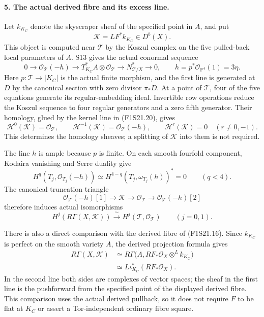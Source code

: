 \paragraph{5. The actual derived fibre and its excess line.}
Let $k_{K_C}$ denote the skyscraper sheaf of the specified
point in $A$, and put
\[
                      \mathcal K=LF^*k_{K_C}\in D^b(X).
 \tag{F1S21.19}
\]
This object is computed near $\mathcal T$ by the Koszul
complex on the five pulled-back local parameters of
$A$. S13 gives the actual conormal sequence
\[
 0\longrightarrow\mathcal O_{\mathcal T}(-h)
 \longrightarrow T^*_{K_C}A\otimes\mathcal O_{\mathcal T}
 \longrightarrow N^*_{\mathcal T/X}\longrightarrow0,
 \qquad h=p^*\mathcal O_{\mathbb P^4}(1)=3\eta.
 \tag{F1S21.20}
\]
Here $p:\mathcal T\to|K_C|$ is the actual finite morphism,
and the first line is generated at $D$ by the canonical
section with zero divisor $\pi_*D$. At a point of
$\mathcal T$, four of the five equations generate its
regular-embedding ideal. Invertible row operations reduce
the Koszul sequence to four regular generators and a
zero fifth generator. Their homology, glued by the kernel
line in (F1S21.20), gives
\[
 \mathcal H^0(\mathcal K)=\mathcal O_{\mathcal T},\qquad
 \mathcal H^{-1}(\mathcal K)=\mathcal O_{\mathcal T}(-h),
 \qquad \mathcal H^r(\mathcal K)=0\quad(r\ne0,-1).
 \tag{F1S21.21}
\]
This determines the homology sheaves; a splitting of
$\mathcal K$ into them is not required.

The line $h$ is ample because $p$ is finite. On each smooth
fourfold component, Kodaira vanishing and Serre duality
give
\[
 H^q(T_j,\mathcal O_{T_j}(-h))
 \simeq H^{4-q}(T_j,\omega_{T_j}(h))^*=0
                                  \qquad(q<4).
 \tag{F1S21.22}
\]
The canonical truncation triangle
\[
 \mathcal O_{\mathcal T}(-h)[1]\longrightarrow\mathcal K
 \longrightarrow\mathcal O_{\mathcal T}
 \longrightarrow\mathcal O_{\mathcal T}(-h)[2]
 \tag{F1S21.23}
\]
therefore induces actual isomorphisms
\[
 H^j(R\Gamma(X,\mathcal K))
       \xrightarrow{\ \sim\ }H^j(\mathcal T,\mathcal O_{\mathcal T})
                           \qquad(j=0,1).
 \tag{F1S21.24}
\]

There is also a direct comparison with the derived fibre
of (F1S21.16). Since $k_{K_C}$ is perfect on the smooth
variety $A$, the derived projection formula gives
\[
 \begin{split}
 R\Gamma(X,\mathcal K)
  &\simeq R\Gamma\bigl(A,
             RF_*\mathcal O_X\otimes^L k_{K_C}\bigr)\\
  &\simeq L\iota_{K_C}^*(RF_*\mathcal O_X).
 \end{split}
 \tag{F1S21.25}
\]
In the second line both sides are complexes of vector
spaces; the sheaf in the first line is the pushforward
from the specified point of the displayed derived fibre.
This comparison uses the actual derived pullback, so it
does not require $F$ to be flat at $K_C$ or assert a
Tor-independent ordinary fibre square.

